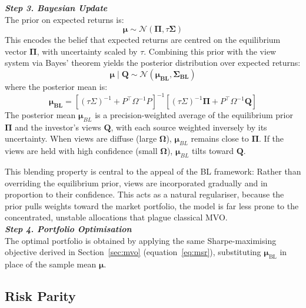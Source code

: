 \documentclass[a4paper,alpha-refs]{scr-contemporary}
\numberwithin{equation}{section}
\begin{document}
\noindent \textbf{\emph{Step 3. Bayesian Update}} \\
\indent The prior on expected returns is:
\begin{equation}
    \boldsymbol{\mu} \sim \mathcal{N}(\boldsymbol{\Pi}, \tau \boldsymbol{\Sigma})
\end{equation}
\indent This encodes the belief that expected returns are centred on the equilibrium 
vector $\boldsymbol{\Pi}$, with uncertainty scaled by $\tau$. Combining this prior 
with the view system via Bayes' theorem yields the posterior distribution over 
expected returns:
\begin{equation}
    \boldsymbol{\mu} \mid \boldsymbol{Q} \sim \mathcal{N}(\boldsymbol{\mu_{BL}}, \boldsymbol{\Sigma_{BL}})
\end{equation}
where the posterior mean is:
\begin{equation}
    \boldsymbol{\mu_{BL}} = 
    \left[(\tau \Sigma)^{-1} 
    + P^{\top}\Omega^{-1}P\right]^{-1}\left[(\tau \Sigma)^{-1}\boldsymbol{\Pi} 
    + P^{\top}\Omega^{-1}\boldsymbol{Q}\right]
\end{equation}
\indent The posterior mean $\boldsymbol{\mu}_{BL}$ is a precision-weighted average of the 
equilibrium prior $\boldsymbol{\Pi}$ and the investor's views $\boldsymbol{Q}$, with each 
source weighted inversely by its uncertainty. 
When views are diffuse (large $\boldsymbol{\Omega}$), $\boldsymbol{\mu}_{BL}$ 
remains close to $\boldsymbol{\Pi}$. 
If the views are held with high confidence (small $\boldsymbol{\Omega}$), 
$\boldsymbol{\mu}_{BL}$ tilts toward $\mathbf{Q}$. \newline

This blending property is central to the appeal of the BL framework: 
Rather than overriding the equilibrium prior, views are incorporated gradually 
and in proportion to their confidence. This acts as a natural regulariser, because the 
prior pulls weights toward the market portfolio, the model is far less prone to the 
concentrated, unstable allocations that plague classical MVO. \\

\noindent \textbf{\emph{Step 4. Portfolio Optimisation}} \\
\indent The optimal portfolio is obtained by applying the same Sharpe-maximising 
objective derived in Section~\ref{sec:mvo} (equation~\ref{eq:msr}), 
substituting $\boldsymbol{\mu}_{\text{BL}}$ in place of the sample mean $\boldsymbol{\mu}$.

\subsection{Risk Parity}
\end{document}
